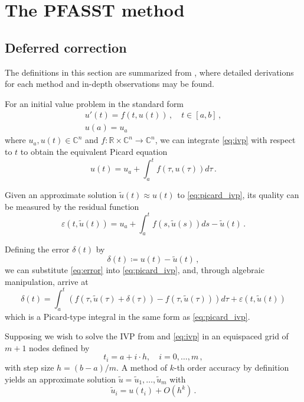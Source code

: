 \chapter{The PFASST method}
\label{chapter:pfasst}

\section{Deferred correction}

The definitions in this section are summarized from \cite{dutt2000spectral}, where detailed derivations for each method and in-depth observations may be found.

For an initial value problem in the standard form
\begin{gather}
    u'(t)=f(t,u(t))\,,\quad t\in[a,b]\,, \label{eq:ivp} \\
    u(a)=u_a \nonumber
\end{gather}
where \(u_a,u(t)\in\mathbb{C}^n\) and \(f \colon \mathbb{R} \times \mathbb{C}^n \to \mathbb{C}^n \), we can integrate \ref{eq:ivp} with respect to \(t\) to obtain the equivalent Picard equation
\begin{equation}
    u(t)=u_a + \int_a^t f(\tau,u(\tau))d\tau\,.
	\label{eq:picard_ivp}
\end{equation}

Given an approximate solution \(\tilde{u}(t) \approx u(t)\) to \ref{eq:picard_ivp}, its quality can be measured by the residual function
\begin{equation}
    \varepsilon(t,\tilde{u}(t)) = u_a + \int_a^t f(s,\tilde{u}(s))ds - \tilde{u}(t)\,.
	\label{eq:residual}
\end{equation}

Defining the error \(\delta(t)\) by
\begin{equation}
    \delta(t) \coloneqq u(t)-\tilde{u}(t)\,,
	\label{eq:error}
\end{equation}
we can substitute \ref{eq:error} into \ref{eq:picard_ivp}, and, through algebraic manipulation, arrive at
\begin{equation}
    \delta(t) = \int_a^t (
    f(\tau,\tilde{u}(\tau)+\delta(\tau)) 
    - f(\tau,\tilde{u}(\tau))) d\tau
    + \varepsilon(t,\tilde{u}(t))
    \label{eq:dcmethod_ivp}
\end{equation}
which is a Picard-type integral in the same form as \ref{eq:picard_ivp}.

Supposing we wish to solve the IVP from and \ref{eq:ivp} in an equispaced grid of \( m+1 \) nodes defined by
\begin{equation}
    t_i = a + i \cdot h, \quad i = 0,\ldots,m\,,
\end{equation}
with step size \( h=(b-a)/m \). A method of \(k\)-th order accuracy by definition yields an approximate solution \( \tilde{u} = \tilde{u}_1, \ldots, \tilde{u}_m \) with
\begin{equation}
    \tilde{u}_i = u(t_i)+O(h^k)\,.
    \label{eq:approx_sol_accuracy}
\end{equation}

